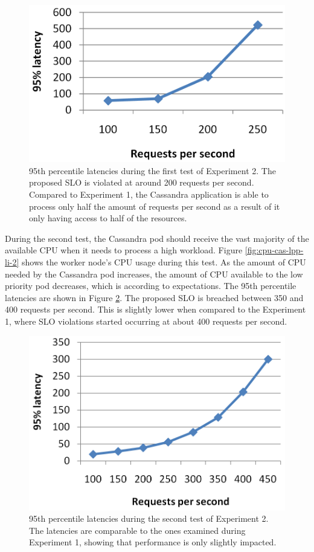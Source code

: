 \begin{figure}
\centering
\includegraphics[width=0.50\columnwidth]{Images/Experiments/CPU/Latencies/lat-cas-lpp-li.PNG}
\caption{95th percentile latencies during the first test of Experiment 2. The proposed SLO is violated at around 200 requests per second. Compared to Experiment 1, the Cassandra application is able to process only half the amount of requests per second as a result of it only having access to half of the resources.}
\label{fig:lat-cas-lpp-li}
\end{figure}

During the second test, the Cassandra pod should receive the vast majority of the available CPU when it needs to process a high workload. Figure \ref{fig:cpu-cas-lpp-li-2} shows the worker node's CPU usage during this test. As the amount of CPU needed by the Cassandra pod increases, the amount of CPU available to the low priority pod decreases, which is according to expectations. The 95th percentile latencies are shown in Figure \ref{fig:lat-cas-lpp-li-2}. The proposed SLO is breached between 350 and 400 requests per second. This is slightly lower when compared to the Experiment 1, where SLO violations started occurring at about 400 requests per second. \\

\begin{figure}
\centering
\includegraphics[width=0.50\columnwidth]{Images/Experiments/CPU/Latencies/lat-cas-lpp-li-2.PNG}
\caption{95th percentile latencies during the second test of Experiment 2. The latencies are comparable to the ones examined during Experiment 1, showing that performance is only slightly impacted.}
\label{fig:lat-cas-lpp-li-2}
\end{figure}

